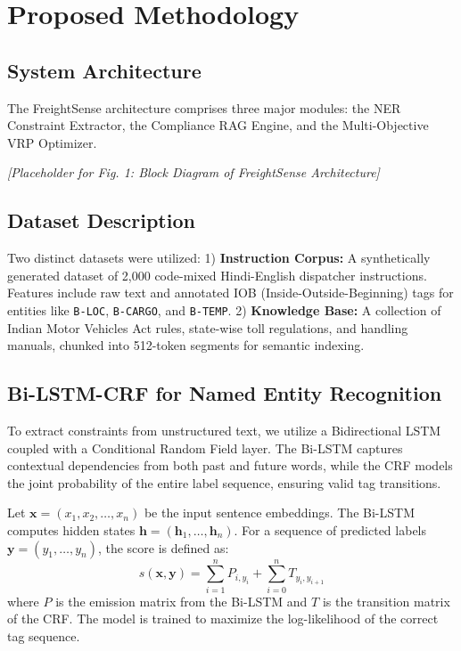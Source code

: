 \documentclass[conference]{IEEEtran}
\begin{document}
\section{Proposed Methodology}

\subsection{System Architecture}
The FreightSense architecture comprises three major modules: the NER Constraint Extractor, the Compliance RAG Engine, and the Multi-Objective VRP Optimizer.

\textit{[Placeholder for Fig. 1: Block Diagram of FreightSense Architecture]}

\subsection{Dataset Description}
Two distinct datasets were utilized:
1) \textbf{Instruction Corpus:} A synthetically generated dataset of 2,000 code-mixed Hindi-English dispatcher instructions. Features include raw text and annotated IOB (Inside-Outside-Beginning) tags for entities like \texttt{B-LOC}, \texttt{B-CARGO}, and \texttt{B-TEMP}.
2) \textbf{Knowledge Base:} A collection of Indian Motor Vehicles Act rules, state-wise toll regulations, and handling manuals, chunked into 512-token segments for semantic indexing.

\subsection{Bi-LSTM-CRF for Named Entity Recognition}
To extract constraints from unstructured text, we utilize a Bidirectional LSTM coupled with a Conditional Random Field layer. The Bi-LSTM captures contextual dependencies from both past and future words, while the CRF models the joint probability of the entire label sequence, ensuring valid tag transitions.

Let $\mathbf{x} = (x_1, x_2, \dots, x_n)$ be the input sentence embeddings. The Bi-LSTM computes hidden states $\mathbf{h} = (\mathbf{h}_1, \dots, \mathbf{h}_n)$. For a sequence of predicted labels $\mathbf{y} = (y_1, \dots, y_n)$, the score is defined as:
\begin{equation}
s(\mathbf{x}, \mathbf{y}) = \sum_{i=1}^{n} P_{i, y_i} + \sum_{i=0}^{n} T_{y_i, y_{i+1}}
\end{equation}
where $P$ is the emission matrix from the Bi-LSTM and $T$ is the transition matrix of the CRF. The model is trained to maximize the log-likelihood of the correct tag sequence.
\end{document}
